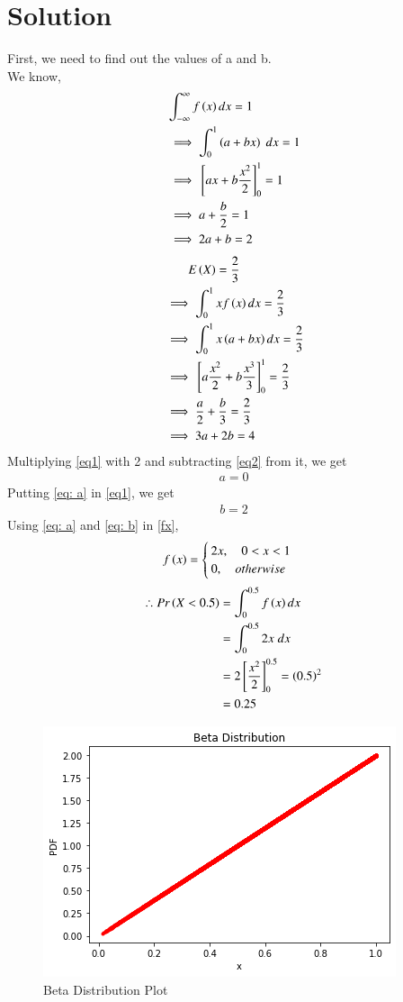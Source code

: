 \documentclass[journal,12pt,twocolumn]{IEEEtran}
\begin{document}
\section{Solution}
First, we need to find out the values of a and b.\\
We know,
\begin{align}
    & \int_{-\infty}^{\infty} f\left(x\right) dx =1\\
    &\implies \int_0^1 \left(a+bx\right) \; dx = 1\\
    &\implies {}\left[ax + b\frac{x^2}{2}\right]_0^1 = 1\\
    &\implies a + \frac{b}{2} = 1\\
    &\implies 2a +b = 2 \label{eq1}
\end{align}
\begin{align}
    & \quad \quad E\left(X\right) = \frac{2}{3}\\
    &\implies \int_0^1 x f\left(x\right) dx = \frac{2}{3} \\
    &\implies \int_0^1 x\left(a + bx\right) dx = \frac{2}{3}\\
    &\implies {}\left[a\frac{x^2}{2}+ b\frac{x^3}{3}\right]_0^1 = \frac{2}{3}\\
    &\implies{\frac{a}{2}+ \frac{b}{3}} = \frac{2}{3}\\
    &\implies 3a + 2b = 4 \label{eq2}
\end{align}
Multiplying \eqref{eq1} with 2 and subtracting \eqref{eq2} from it, we get
\begin{align}
    a = 0\label{eq: a}
\end{align}
Putting \eqref{eq: a} in \eqref{eq1}, we get
\begin{align}
     b=2 \label{eq: b}
\end{align}
Using \eqref{eq: a} and \eqref{eq: b} in \eqref{fx},
\begin{align}
    f\left(x\right)  = 
    \begin{cases}
    2x  , \quad 0<x<1 \\
    0, \quad otherwise
    \end{cases}
\end{align}
\begin{align}
    \therefore Pr\left(X<0.5\right) &= \int_0^{0.5} f\left(x\right) dx\\ 
    &= \int_0^{0.5} 2x \; dx\\
    & = 2{}\left[\frac{x^2}{2}\right]_0^{0.5} = \left(0.5\right)^2\\
    &= 0.25
\end{align}
\begin{figure}[!ht]
\centering
\includegraphics[width=\columnwidth]{pdf plot.png}
\caption{Beta Distribution Plot}
\label{fig:Beta Plot}
\end{figure}
\end{document}
